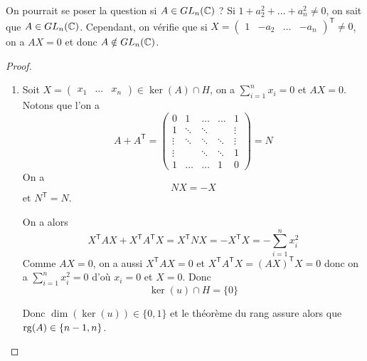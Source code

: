 \begin{remark}
    On pourrait se poser la question si $A\in GL_{n}(\mathbb{C})$ ? Si $1+a_{2}^{2}+\dots+a_{n}^{2}\neq0$, on sait que $A\in GL_{n}(\mathbb{C})$. Cependant, on vérifie que si $X=\begin{pmatrix}
        1 & -a_{2}&\dots&-a_{n}
    \end{pmatrix}^{\mathsf{T}}\neq0$, on a $AX=0$ et donc $A\notin GL_{n}(\mathbb{C})$.
\end{remark}

\begin{proof}
    \phantom{}
    \begin{enumerate}
        \item Soit $X=\begin{pmatrix}
            x_{1}&\dots &x_{n}
        \end{pmatrix}\in \ker(A)\cap H$, on a $\sum_{i=1}^{n}x_{i}=0$ et $AX=0$. Notons que l'on a 
        \begin{equation}
            A+A^{\mathsf{T}}=
            \begin{pmatrix}
                0&1 &\dots & \dots& 1\\
                1 & \ddots & \ddots & & \vdots\\
                \vdots & \ddots & \ddots & \ddots & \vdots\\
                \vdots & & \ddots & \ddots & 1\\
                1 &\dots & \dots & 1 & 0
            \end{pmatrix}=N
        \end{equation}
        On a 
        \begin{equation}
            NX=-X
        \end{equation}
        et $N^{\mathsf{T}}=N$.

        On a alors 
        \begin{equation}
            X^{\mathsf{T}}AX+X^{\mathsf{T}}A^{\mathsf{T}}X=X^{\mathsf{T}}NX=-X^{\mathsf{T}}X=-\sum_{i=1}^{n}x_{i}^{2}
        \end{equation}
        Comme $AX=0$, on a aussi $X^{\mathsf{T}}AX=0$ et $X^{\mathsf{T}}A^{\mathsf{T}}X=(AX)^{\mathsf{T}}X=0$ donc on a $\sum_{i=1}^{n}x_{i}^{2}=0$ d'où $x_{i}=0$ et $X=0$. Donc 
        \begin{equation}
            \boxed{\ker(u)\cap H}=\lbrace 0\rbrace
        \end{equation}

        Donc $\dim(\ker(u))\in\lbrace0,1\rbrace$ et le théorème du rang assure alors que $\operatorname{rg}(A)\in\lbrace n-1,n\rbrace$.


\end{enumerate}
\end{proof}

